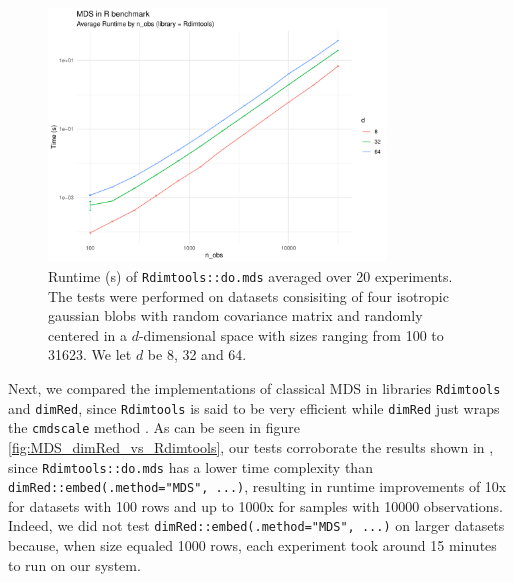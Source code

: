 \documentclass[a4paper,12pt]{article}
\begin{document}
\begin{figure}[ht]
    \centering
    \includegraphics[width=0.8\textwidth]{figures/MDS_Rdimtools.pdf}
    \caption{Runtime (s) of \texttt{Rdimtools::do.mds} averaged over 20 experiments. The tests were performed on datasets consisiting of four isotropic gaussian blobs with random covariance matrix and randomly centered in a $d$-dimensional space with sizes ranging from 100 to 31623. We let $d$ be 8, 32 and 64.}
    \label{fig:MDS_Rdimtools}
\end{figure}

Next, we compared the implementations of classical MDS in libraries \texttt{Rdimtools} and \texttt{dimRed}, since \texttt{Rdimtools} is said to be very efficient while \texttt{dimRed} just wraps the \texttt{cmdscale} method \cite{Kraemer2018dimRedAC}. As can be seen in figure \ref{fig:MDS_dimRed_vs_Rdimtools}, our tests corroborate the results shown in \cite{Rdimtools}, since \texttt{Rdimtools::do.mds} has a lower time complexity than \texttt{dimRed::embed(.method="MDS", ...)}, resulting in runtime improvements of 10x for datasets with 100 rows and up to 1000x for samples with 10000 observations. Indeed, we did not test \texttt{dimRed::embed(.method="MDS", ...)} on larger datasets because, when size equaled 1000 rows, each experiment took around 15 minutes to run on our system.
\end{document}
